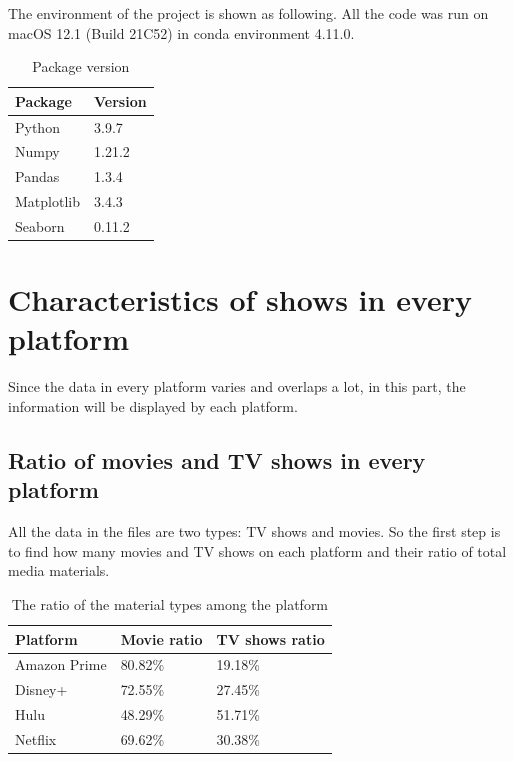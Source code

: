 \documentclass{article}
\begin{document}
The environment of the project is shown as following. All the code was run on 
macOS 12.1 (Build 21C52) in conda environment 4.11.0.
\begin{table}[h]
	\centering
	\caption{Package version}
	\label{package_version}
	\begin{tabular}{ll}
	\toprule
	Package    & Version \\
	\midrule
	Python     & 3.9.7   \\
	Numpy      & 1.21.2  \\
	Pandas     & 1.3.4   \\
	Matplotlib & 3.4.3   \\
	Seaborn    & 0.11.2  \\
	\bottomrule
	\end{tabular}
	\end{table}

\section{Characteristics of shows in every platform}

Since the data in every platform varies and overlaps a lot, in this part, the 
information will be displayed by each platform.

\subsection{Ratio of movies and TV shows in every platform}

All the data in the files are two types: TV shows and movies. So the first step 
is to find how many movies and TV shows on each platform and their ratio of 
total media materials.

\begin{table}[!htb]
	\centering
	\caption{The ratio of the material types among the platform}
	\label{tab:type_ratio}
	\begin{tabular}{@{}lll@{}}
	\toprule
	Platform     & Movie ratio & TV shows ratio \\ \midrule
	Amazon Prime & 80.82\%     & 19.18\%        \\
	Disney+      & 72.55\%     & 27.45\%        \\
	Hulu         & 48.29\%     & 51.71\%        \\
	Netflix      & 69.62\%     & 30.38\%        \\ \bottomrule
	\end{tabular}
\end{table}
\end{document}
